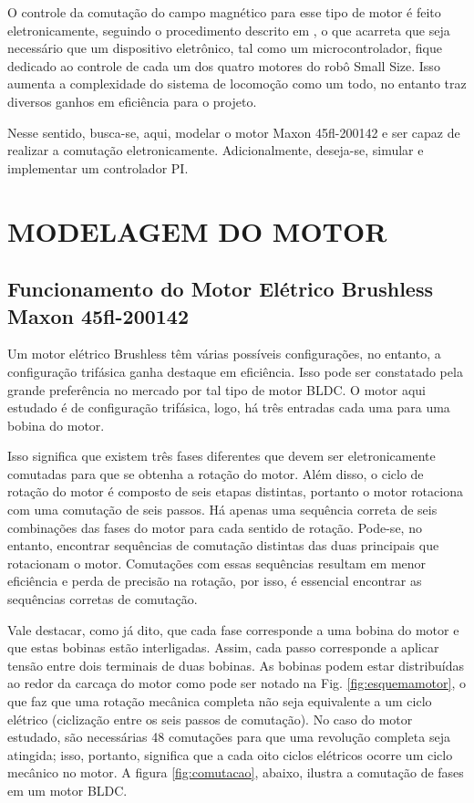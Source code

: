\documentclass[10pt,fleqn,a4paper]{article}
\begin{document}
    O controle da comutação do campo magnético para esse tipo de motor é feito eletronicamente, seguindo o procedimento descrito em \cite{introducaobldc}, o que acarreta que seja necessário que um dispositivo eletrônico, tal como um microcontrolador, fique dedicado ao controle de cada um dos quatro motores do robô Small Size. Isso aumenta a complexidade do sistema de locomoção como um todo, no entanto traz diversos ganhos em eficiência para o projeto.
    
    Nesse sentido, busca-se, aqui, modelar o motor Maxon 45fl-200142 e ser capaz de realizar a comutação eletronicamente. Adicionalmente, deseja-se, simular e implementar um controlador PI.
    
    \section{MODELAGEM DO MOTOR}
    \subsection{Funcionamento do Motor Elétrico Brushless Maxon 45fl-200142}
    
    Um motor elétrico Brushless têm várias possíveis configurações, no entanto, a configuração trifásica ganha destaque em eficiência. Isso pode ser constatado pela grande preferência no mercado por tal tipo de motor BLDC. O motor aqui estudado é de configuração trifásica, logo, há três entradas cada uma para uma bobina do motor.
    
    Isso significa que existem três fases diferentes que devem ser eletronicamente comutadas para que se obtenha a rotação do motor. Além disso, o ciclo de rotação do motor é composto de seis etapas distintas, portanto o motor rotaciona com uma comutação de seis passos. Há apenas uma sequência correta de seis combinações das fases do motor para cada sentido de rotação. Pode-se, no entanto, encontrar sequências de comutação distintas das duas principais que rotacionam o motor. Comutações com essas sequências resultam em menor eficiência e perda de precisão na rotação, por isso, é essencial encontrar as sequências corretas de comutação.
    
    Vale destacar, como já dito, que cada fase corresponde a uma bobina do motor e que estas bobinas estão interligadas. Assim, cada passo corresponde a aplicar tensão entre dois terminais de duas bobinas. As bobinas podem estar distribuídas ao redor da carcaça do motor como pode ser notado na Fig. \ref{fig:esquemamotor}, o que faz que uma rotação mecânica completa não seja equivalente a um ciclo elétrico (ciclização entre os seis passos de comutação). No caso do motor estudado, são necessárias 48 comutações para que uma revolução completa seja atingida; isso, portanto, significa que a cada oito ciclos elétricos ocorre um ciclo mecânico no motor. A figura \ref{fig:comutacao}, abaixo, ilustra a comutação de fases em um motor BLDC.
\end{document}
